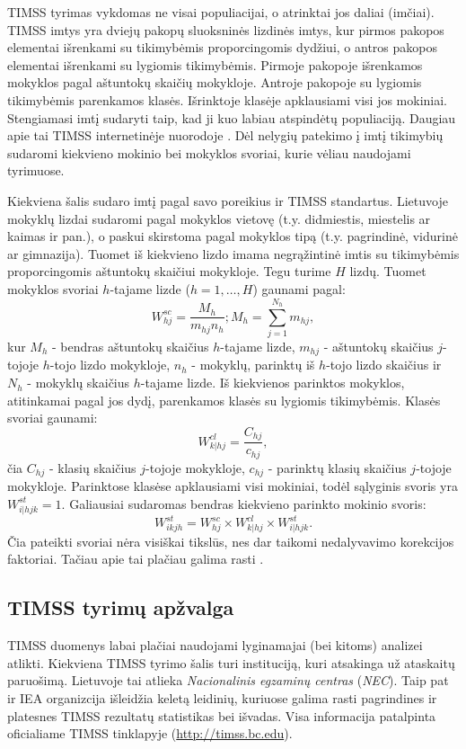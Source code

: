 \documentclass[12pt,a4paper]{article}
\begin{document}
\indent TIMSS tyrimas vykdomas ne visai populiacijai, o atrinktai jos daliai (imčiai). TIMSS imtys yra dviejų pakopų sluoksninės lizdinės imtys, kur pirmos pakopos elementai išrenkami su tikimybėmis proporcingomis dydžiui, o antros pakopos elementai išrenkami su lygiomis tikimybėmis. Pirmoje pakopoje išrenkamos mokyklos pagal aštuntokų skaičių mokykloje. Antroje pakopoje su lygiomis tikimybėmis parenkamos klasės. Išrinktoje klasėje apklausiami visi jos mokiniai. Stengiamasi imtį sudaryti taip, kad ji kuo labiau atspindėtų populiaciją. Daugiau apie tai TIMSS internetinėje nuorodoje \cite{2011Sample}. Dėl nelygių patekimo į imtį tikimybių sudaromi kiekvieno mokinio bei mokyklos svoriai, kurie vėliau naudojami tyrimuose.

\indent Kiekviena šalis sudaro imtį pagal savo poreikius ir TIMSS standartus. Lietuvoje mokyklų lizdai sudaromi pagal mokyklos vietovę (t.y. didmiestis, miestelis ar kaimas ir pan.), o paskui skirstoma pagal mokyklos tipą (t.y. pagrindinė, vidurinė ar gimnazija). Tuomet iš kiekvieno lizdo imama negrąžintinė imtis su tikimybėmis proporcingomis aštuntokų skaičiui mokykloje. Tegu turime $H$ lizdų. Tuomet mokyklos svoriai $h$-tajame lizde ($h=1,\dots,H$) gaunami pagal:
\begin{equation}
W^{sc}_{hj} = \frac{M_h}{m_{hj}n_h}; M_h=\sum^{N_h}_{j=1} m_{hj},
\end{equation}
kur $M_h$ - bendras aštuntokų skaičius $h$-tajame lizde, $m_{hj}$ - aštuntokų skaičius $j$-tojoje $h$-tojo lizdo mokykloje, $n_h$ - mokyklų, parinktų iš $h$-tojo lizdo skaičius ir $N_h$ - mokyklų skaičius $h$-tajame lizde. Iš kiekvienos parinktos mokyklos, atitinkamai pagal jos dydį, parenkamos klasės su lygiomis tikimybėmis. Klasės svoriai gaunami:
\begin{equation}
W^{cl}_{k|hj} = \frac{C_{hj}}{c_{hj}},
\end{equation}
čia $C_{hj}$ - klasių skaičius $j$-tojoje mokykloje, $c_{hj}$ - parinktų klasių skaičius $j$-tojoje mokykloje. Parinktose klasėse apklausiami visi mokiniai, todėl sąlyginis svoris yra $W^{st}_{i|hjk} = 1$. Galiausiai sudaromas bendras kiekvieno parinkto mokinio svoris:
\begin{equation}
W^{st}_{ikjh} = W^{sc}_{hj}\times W^{cl}_{k|hj}\times W^{st}_{i|hjk}.
\end{equation}
Čia pateikti svoriai nėra visiškai tikslūs, nes dar taikomi nedalyvavimo korekcijos faktoriai. Tačiau apie tai plačiau galima rasti \cite{2011Sample}.

\subsection{TIMSS tyrimų apžvalga}
TIMSS duomenys labai plačiai naudojami lyginamajai (bei kitoms) analizei atlikti. Kiekviena TIMSS tyrimo šalis turi instituciją, kuri atsakinga už ataskaitų paruošimą. Lietuvoje tai atlieka \textit{Nacionalinis egzaminų centras} (\textit{NEC}). Taip pat ir IEA organizcija išleidžia keletą leidinių, kuriuose galima rasti pagrindines ir platesnes TIMSS rezultatų statistikas bei išvadas. Visa informacija patalpinta oficialiame TIMSS tinklapyje (\url{http://timss.bc.edu}).
\end{document}
